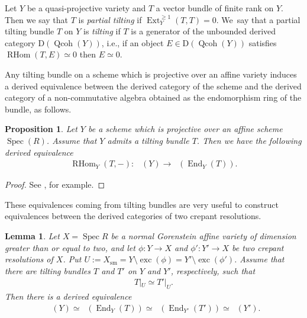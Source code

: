 \documentclass[pdftex]{sigma}
\DeclareMathOperator{\D}{D^b}
\DeclareMathOperator{\End}{End}
\DeclareMathOperator{\exc}{exc}
\DeclareMathOperator{\Ext}{Ext}
\DeclareMathOperator{\Qcoh}{Qcoh}
\DeclareMathOperator{\RHom}{RHom}
\DeclareMathOperator{\Spec}{Spec}
\numberwithin{equation}{section}
\newtheorem{Lemma}[Theorem]{Lemma}
\newtheorem{Proposition}[Theorem]{Proposition}
 { \theoremstyle{definition}
\newtheorem{Definition}[Theorem]{Definition}
\newtheorem{Example}[Theorem]{Example}
\newtheorem{Remark}[Theorem]{Remark} }
\begin{document}
\begin{Definition}
Let $Y$ be a quasi-projective variety and $T$ a vector bundle of finite rank on $Y$.
Then we say that $T$ is \textit{partial tilting} if $\Ext_Y^{\geq 1}(T, T) = 0$.
We~say that a partial tilting bundle $T$ on $Y$ is \textit{tilting} if $T$ is a generator of the unbounded derived category $\mathrm{D}(\Qcoh(Y))$,
i.e., if an object $E \in \mathrm{D}(\Qcoh(Y))$ satisfies $\RHom(T,E) \simeq 0$ then $E \simeq 0$.
\end{Definition}

Any tilting bundle on a scheme which is projective over an affine variety
induces a derived equivalence between the derived category of the scheme and
the derived category of a non-commutative algebra obtained as the endomorphism ring of the bundle, as follows.

\begin{Proposition}
Let $Y$ be a scheme which is projective over an affine scheme $\Spec(R)$.
Assume that $Y$ admits a tilting bundle $T$.
Then we have the following derived equivalence
\begin{gather*}
\RHom_Y(T,-) \colon \ \D(Y) \to \D(\End_Y(T)).
\end{gather*}
\end{Proposition}

\begin{proof}
See \cite[Lemma 3.3]{TU10}, for example.
\end{proof}

These equivalences coming from tilting bundles are very useful to construct equivalences
between the derived categories of two crepant resolutions.

\begin{Lemma} \label{lem tilting equivalence flop}
Let $X = \Spec R$ be a normal Gorenstein affine variety of dimension greater than or equal to two,
and let $\phi\colon Y \to X$ and $\phi'\colon Y' \to X$ be two crepant resolutions of $X$.
Put $U := X_{\mathrm{sm}} = Y \setminus \exc(\phi) = Y' \setminus \exc(\phi')$.
Assume that there are tilting bundles $T$ and $T'$ on $Y$ and $Y'$, respectively, such that
\begin{gather*}
T|_U \simeq T'|_U.
\end{gather*}
Then there is a derived equivalence
\begin{gather*}
\D(Y) \simeq \D(\End_Y(T)) \simeq \D(\End_{Y'}(T')) \simeq \D(Y').
\end{gather*}
\end{Lemma}
\end{document}

